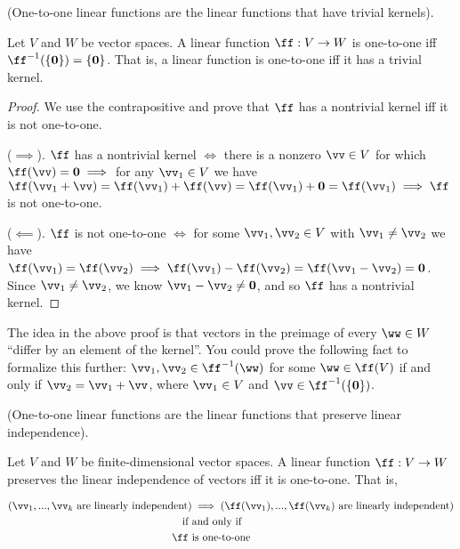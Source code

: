 \begin{theorem}
\label{ch::lin_alg::thm::linear_fn_1-1_trivial_kernel}
    (One-to-one linear functions are the linear functions that have trivial kernels). 
    
    Let $V$ and $W$ be vector spaces. A linear function $\ff:V \rightarrow W$ is one-to-one iff $\ff^{-1}(\{\mathbf{0}\}) = \{\mathbf{0}\}$. That is, a linear function is one-to-one iff it has a trivial kernel.
\end{theorem}

\begin{proof}
    We use the contrapositive and prove that $\ff$ has a nontrivial kernel iff it is not one-to-one.
    
    ($\implies$). $\ff$ has a nontrivial kernel $\iff$ there is a nonzero $\vv \in V$ for which $\ff(\vv) = \mathbf{0} \implies$ for any $\vv_1 \in V$ we have $\ff(\vv_1 + \vv) = \ff(\vv_1) + \ff(\vv) = \ff(\vv_1) + \mathbf{0} = \ff(\vv_1) \implies \ff$ is not one-to-one.
    
    ($\impliedby$). $\ff$ is not one-to-one $\iff$ for some $\vv_1, \vv_2 \in V$ with $\vv_1 \neq \vv_2$ we have $\ff(\vv_1) = \ff(\vv_2) \implies \ff(\vv_1) - \ff(\vv_2) = \ff(\vv_1 - \vv_2) = \mathbf{0}$. Since $\vv_1 \neq \vv_2$, we know $\vv_1 - \vv_2 \neq \mathbf{0}$, and so $\ff$ has a nontrivial kernel.
\end{proof}

\begin{remark}
    The idea in the above proof is that vectors in the preimage of every $\ww \in W$ ``differ by an element of the kernel''. You could prove the following fact to formalize this further: $\vv_1, \vv_2 \in \ff^{-1}(\ww)$ for some $\ww \in \ff(V)$ if and only if $\vv_2 = \vv_1 + \vv$, where $\vv_1 \in V$ and $\vv \in \ff^{-1}(\{\mathbf{0}\})$.
\end{remark}

\begin{theorem}
\label{ch::lin_alg::thm::one_to_one_linear_fns_are_the_linear_fns_preserving_linear_independence}

    (One-to-one linear functions are the linear functions that preserve linear independence). 
    
    Let $V$ and $W$ be finite-dimensional vector spaces. A linear function $\ff:V \rightarrow W$ preserves the linear independence of vectors iff it is one-to-one. That is, 
    
    \begin{align*}
       (\vv_1, ..., \vv_k \text{ are linearly independent}) &\implies (\ff(\vv_1), ..., \ff(\vv_k) \text{ are linearly independent})\\
        \text{if} \text{ } &\text{and only if} \\
        \ff \text{ } &\text{is one-to-one}
    \end{align*}
\end{theorem}

